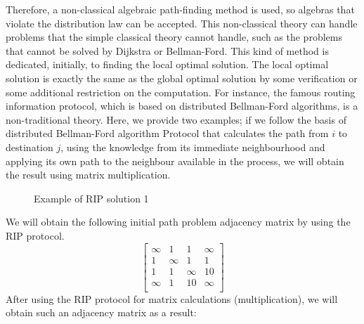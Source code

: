 \documentclass[a4paper,12pt,twoside,openright]{report}
\begin{document}
Therefore, a non-classical algebraic path-finding method is used, so algebras that violate the distribution law can be accepted.  This non-classical theory can handle problems that the simple classical theory cannot handle, such as the problems that cannot be solved by Dijkstra or Bellman-Ford.
This kind of method is dedicated, initially, to finding the local optimal solution. The local optimal solution is exactly the same as the global optimal solution by some verification or some additional restriction on the computation. For instance, the famous routing information protocol, which is based on distributed Bellman-Ford algorithms, is a non-traditional theory.
Here, we provide two examples; if we follow the basis of distributed Bellman-Ford algorithm Protocol \cite{hedrick_routing_1988} that calculates the path from $i$ to destination $j$, using the knowledge from its immediate neighbourhood and applying its own path to the neighbour available in the process, we will obtain the result using matrix multiplication. 
\begin{figure}[H]
\centering
{}
\label{example:rip:1}
\caption{Example of RIP solution 1}
\end{figure}
We will obtain the following initial path problem adjacency matrix by using the RIP protocol.
\[
\begin{bmatrix}
    \infty & 1 & 1 & \infty \\
    1 & \infty & 1 & 1 \\
    1 & 1 & \infty & 10 \\
    \infty & 1 & 10 & \infty \\
\end{bmatrix}
\]
After using the RIP protocol for matrix calculations (multiplication), we will obtain such an adjacency matrix as a result:
\end{document}
